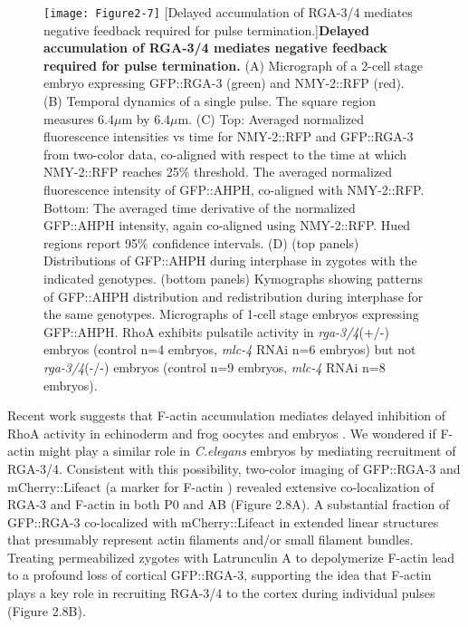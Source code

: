 \documentclass{ucetd}
\begin{document}
\begin{figure}[!htbp]
\centering
\texttt{[image: Figure2-7]}
[Delayed accumulation of RGA-3/4 mediates negative feedback required for pulse termination.]{\textbf{Delayed accumulation of RGA-3/4 mediates negative feedback required for pulse termination.} (A) Micrograph of a 2-cell stage embryo expressing GFP::RGA-3 (green) and NMY-2::RFP (red). (B) Temporal dynamics of a single pulse. The square region measures 6.4$\mu$m by 6.4$\mu$m. (C) Top: Averaged normalized fluorescence intensities vs time for NMY-2::RFP and GFP::RGA-3 from two-color data, co-aligned with respect to the time at which NMY-2::RFP reaches 25$\%$ threshold. The averaged normalized fluorescence intensity of GFP::AHPH, co-aligned with NMY-2::RFP.  Bottom: The averaged time derivative of the normalized GFP::AHPH intensity, again co-aligned using NMY-2::RFP.  Hued regions report 95$\%$ confidence intervals. (D) (top panels) Distributions of GFP::AHPH during interphase in zygotes  with the indicated genotypes.  (bottom panels) Kymographs showing patterns of GFP::AHPH distribution and redistribution during interphase for the same genotypes. Micrographs of 1-cell stage embryos expressing GFP::AHPH. RhoA exhibits pulsatile activity in \textit{rga-3/4}(+/-) embryos (control n=4 embryos, \textit{mlc-4} RNAi n=6 embryos) but not \textit{rga-3/4}(-/-) embryos (control n=9 embryos, \textit{mlc-4} RNAi n=8 embryos).}
\end{figure}

Recent work suggests that F-actin accumulation mediates delayed inhibition of RhoA activity in echinoderm and frog oocytes and embryos \cite{Bement:2015jp}.  We wondered if F-actin might play a similar role in \textit{C.elegans} embryos by mediating recruitment of RGA-3/4.  Consistent with this possibility, two-color imaging of GFP::RGA-3 and mCherry::Lifeact  (a marker for F-actin  \cite{Pohl:2012bg}) revealed extensive co-localization of RGA-3 and F-actin in both P0 and AB (Figure 2.8A).  A substantial fraction of GFP::RGA-3 co-localized with mCherry::Lifeact in extended linear structures that presumably represent actin filaments and/or small filament bundles. Treating permeabilized zygotes \cite{Carvalho:2011ce, Olson:2012cs} with Latrunculin A to depolymerize F-actin lead to a profound loss of cortical GFP::RGA-3, supporting the idea that F-actin plays a key role in recruiting RGA-3/4 to the cortex during individual pulses (Figure 2.8B).
\end{document}
